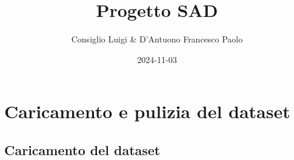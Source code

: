 \documentclass[
]{article}
\title{Progetto SAD}
\author{Consiglio Luigi \& D'Antuono Francesco Paolo}
\date{2024-11-03}
\begin{document}
\maketitle

\section{Caricamento e pulizia del
dataset}\label{caricamento-e-pulizia-del-dataset}

\subsection{Caricamento del dataset}\label{caricamento-del-dataset}
\end{document}
